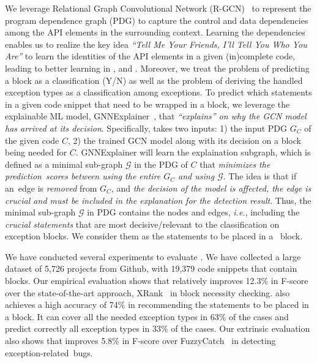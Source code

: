 We leverage Relational Graph Convolutional Network (R-GCN)~\cite{rgcn}
to represent the program dependence graph (PDG) to capture the control
and data dependencies among the API elements in the surrounding
context. Learning the dependencies enables us to realize the
key idea {\em ``Tell Me Your Friends, I'll Tell You Who You Are''} to
learn the identities of the API elements in a given (in)complete code,
leading to better learning in {\xblock}, {\xstate} and
{\xtype}. Moreover, we treat the problem of predicting a
 block as a classification (Y/N) as well as the
problem of deriving the handled exception types as a classification
among exceptions.
%
To predict which statements in a given code snippet that need to be
wrapped in a  block, we leverage the explainable ML
model, GNNExplainer~\cite{GNNExplainer}, that {\em ``explains'' on why
  the GCN model has arrived at its decision}. Specifically, {\tool}
takes two inputs: 1) the input PDG $G_C$ of the given code $C$,
2) the trained GCN model along with its decision on a
 block being needed for $C$.
%
GNNExplainer will learn the explaination subgraph, which is
defined as a minimal sub-graph $\mathcal{G}$ in the PDG of $C$ that
{\em minimizes the prediction~scores between using the entire $G_C$
  and using $\mathcal{G}$}. The idea is that if an~edge is {\em
  removed} from $G_C$, and {\em the decision of the model is affected,
  the edge is crucial and must be included in the explanation for
  the detection result}. Thus, the minimal sub-graph $\mathcal{G}$ in
PDG contains the nodes and edges, {\em i.e.},  including the {\em
  crucial statements} that are most decisive/relevant to the
classification on exception blocks. We consider them as the statements
to be placed in a ~block.

We have conducted several experiments to evaluate {\tool}. We have
collected a large dataset of 5,726 projects from Github, with 19,379
code snippets that contain  blocks.
%
Our empirical evaluation shows that {\tool} relatively
improves 12.3\% in F-score over the state-of-the-art approach,
XRank~\cite{xrank-fse20} in  block necessity checking.
{\tool} also achieves a high accuracy of 74\% in recommending the
statements to be placed in a  block. It can cover all
the needed exception types in 63\% of the cases and predict correctly
all exception types in 33\% of the cases. Our extrinsic evaluation
also shows that {\tool} improves 5.8\% in F-score over
FuzzyCatch~\cite{xrank-fse20} in detecting exception-related~bugs.

